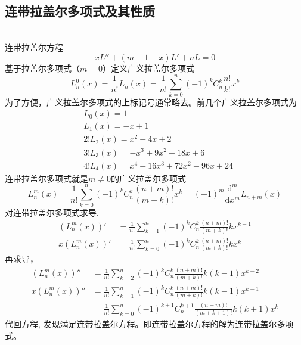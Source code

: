 		~~\\ 
		\subsection{连带拉盖尔多项式及其性质} 
		~\\
		连带拉盖尔方程
				\begin{equation*}
					x L''  + (m+1 -x) L' +n L =0
				\end{equation*}	 
		基于拉盖尔多项式（$m=0$）定义广义拉盖尔多项式
				\begin{equation*}
					L^0 _n (x)= \frac{1} {n!} L_n (x) = \frac{1} {n!} \sum_{k=0}^{n} (-1)^k C^k _n \frac{n!}{k!}x^k 
				\end{equation*}	
			为了方便，广义拉盖尔多项式的上标记号通常略去。前几个广义拉盖尔多项式为 \\
			$$\begin{aligned}
				& L_0(x)=1 \\
				& L_1(x)=-x+1 \\
				& 2! L_2(x)=x^2-4 x+2 \\
				& 3! L_3(x)=-x^3+9 x^2-18 x+6 \\
				& 4! L_4(x)=x^4 -16x^3 +72 x^2-96 x+24
				\end{aligned}
			$$
			连带拉盖尔多项式就是$m\ne 0$的广义拉盖尔多项式
				\begin{equation*}
					L^m _n (x)= \frac{1} {n!}  \sum_{k=0}^{n} (-1)^k C^k _n \frac{(n+m)!}{(m+k)!}x^k = (-1)^m \frac{\mathrm{d}^m}{\mathrm{d}x^m} L_{n+m}(x)
				\end{equation*}	
			对连带拉盖尔多项式求导, 
			\begin{equation*}
				\begin{aligned}
					(L^m _n (x))'&= \frac{1} {n!}  \sum_{k=1}^{n} (-1)^k C^k _n \frac{(n+m)!}{(m+k)!} k x^{k-1} \\ 
					x (L^m _n (x))'&= \frac{1} {n!}  \sum_{k=0}^{n} (-1)^k C^k _n \frac{(n+m)!}{(m+k)!} k x^{k} 
				\end{aligned}
			\end{equation*}	
		   再求导，
			\begin{equation*}
				\begin{aligned}
					(L^m _n (x))''&= \frac{1} {n!}  \sum_{k=2}^{n} (-1)^k C^k _n \frac{(n+m)!}{(m+k)!} k(k-1) x^{k-2} \\ 
					x (L^m _n (x))''&= \frac{1} {n!}  \sum_{k=1}^{n} (-1)^k C^k _n \frac{(n+m)!}{(m+k)!} k(k-1) x^{k-1} \\ 
					&= \frac{1} {n!}  \sum_{k=0}^{n} (-1)^{k+1} C^{k+1} _n \frac{(n+m)!}{(m+k+1)!} k(k+1) x^k 
				\end{aligned}
			\end{equation*}	
			代回方程, 发现满足连带拉盖尔方程。即连带拉盖尔方程的解为连带拉盖尔多项式。
	
